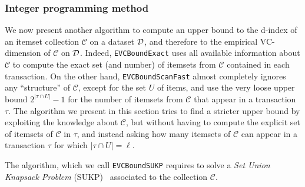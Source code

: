 
\subsubsection{Integer programming method}
We now present another algorithm to compute an upper bound to the d-index of an
itemset collection $\mathcal{C}$ on a dataset ${\cal D}$, and therefore to the
empirical VC-dimension of $\mathcal{C}$ on ${\cal D}$. 
Indeed, \texttt{EVCBoundExact} uses all available information about
$\mathcal{C}$ to compute the exact set (and number) of itemsets from
$\mathcal{C}$ contained in each transaction. On the other hand,
\texttt{EVCBoundScanFast} almost completely ignores any ``structure'' of
$\mathcal{C}$, except for the set $U$ of items, and use the very loose upper bound
$2^{|\tau\cap U|}-1$ for the number of itemsets from $\mathcal{C}$ that appear
in a transaction $\tau$. The algorithm we present in this section tries to find
a stricter upper bound by exploiting the knowledge about $\mathcal{C}$, but
without having to compute the explicit set of itemsets of $\mathcal{C}$ in
$\tau$, and instead asking how many itemsets of $\mathcal{C}$ can appear in a
transaction $\tau$ for which $|\tau\cap U|=\ell$.

The algorithm, which we call \texttt{EVCBoundSUKP} requires to solve a \emph{Set
Union Knapsack Problem} (SUKP)~\citep{GoldschmidtNY94} associated to the
collection $\mathcal{C}$.

